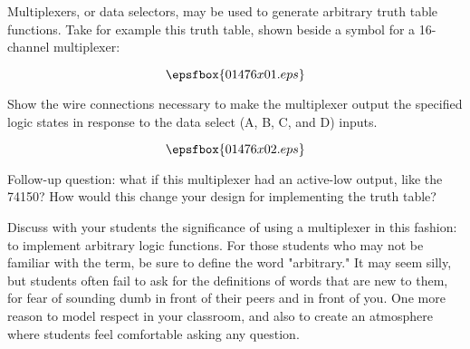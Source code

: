 

Multiplexers, or data selectors, may be used to generate arbitrary truth table functions.  Take for example this truth table, shown beside a symbol for a 16-channel multiplexer:

$$\epsfbox{01476x01.eps}$$

Show the wire connections necessary to make the multiplexer output the specified logic states in response to the data select (A, B, C, and D) inputs.







$$\epsfbox{01476x02.eps}$$

\vskip 10pt

Follow-up question: what if this multiplexer had an active-low output, like the 74150?  How would this change your design for implementing the truth table?







Discuss with your students the significance of using a multiplexer in this fashion: to implement arbitrary logic functions.  For those students who may not be familiar with the term, be sure to define the word "arbitrary."  It may seem silly, but students often fail to ask for the definitions of words that are new to them, for fear of sounding dumb in front of their peers and in front of you.  One more reason to model respect in your classroom, and also to create an atmosphere where students feel comfortable asking any question.




